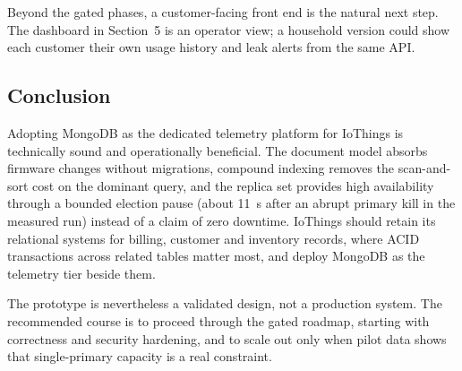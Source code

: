 \documentclass[11pt,a4paper]{article}
\begin{document}
Beyond the gated phases, a customer-facing front end is the natural next step. The dashboard in Section~5 is an operator view; a household version could show each customer their own usage history and leak alerts from the same API.

\subsection{Conclusion}
Adopting MongoDB as the dedicated telemetry platform for IoThings is technically sound and operationally beneficial. The document model absorbs firmware changes without migrations, compound indexing removes the scan-and-sort cost on the dominant query, and the replica set provides high availability through a bounded election pause (about 11~s after an abrupt primary kill in the measured run) instead of a claim of zero downtime. IoThings should retain its relational systems for billing, customer and inventory records, where ACID transactions across related tables matter most, and deploy MongoDB as the telemetry tier beside them.

The prototype is nevertheless a validated design, not a production system. The recommended course is to proceed through the gated roadmap, starting with correctness and security hardening, and to scale out only when pilot data shows that single-primary capacity is a real constraint.
\end{document}
